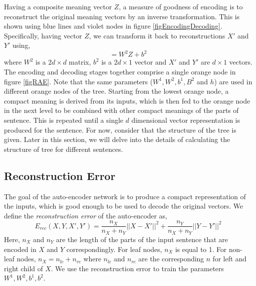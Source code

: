 \documentclass[twoside,12pt]{article}
\begin{document}
Having a composite meaning vector $Z$, a measure of goodness of encoding is to reconstruct the original meaning vectors by an inverse transformation. This is shown using blue lines and violet nodes in figure \ref{figEncodingDecoding}. Specifically, having vector $Z$, we can transform it back to reconstructions $X'$ and $Y'$ using,
\begin{equation}
[X',Y'] = W^2 Z + b^2
\label{eqReconst}
\end{equation}
where $W^2$ is a $2d\times d$ matrix, $b^2$ is a $2d\times 1$ vector and $X'$ and $Y'$ are $d\times 1$ vectors. The encoding and decoding stages together comprise a single orange node in figure \ref{figRAE}. Note that the same parameters ($W^1,W^2,b^1,B^2$ and $h$) are used in different orange nodes of the tree. Starting from the lowest orange node, a compact meaning is derived from its inputs, which is then fed to the orange node in the next level to be combined with other compact meanings of the parts of sentence. This is repeated until a single $d$ dimensional vector representation is produced for the sentence. For now, consider that the structure of the tree is given. Later in this section, we will delve into the details of calculating the structure of tree for different sentences.

\subsection{Reconstruction Error}
The goal of the auto-encoder network is to produce  a compact representation of the inputs, which is good enough to be used to decode the original vectors. We define the \emph{reconstruction error} of the auto-encoder as,
\begin{equation}
E_{rec}(X,Y,X',Y') = \frac{n_X}{n_X+n_Y}||X-X'||^2+\frac{n_Y}{n_X+n_Y}||Y-Y'||^2
\label{eqRecErr}
\end{equation}
Here, $n_X$ and $n_Y$ are the length of the parts of the input sentence that are encoded in $X$ and $Y$ correspondingly. For leaf nodes, $n_X$ is equal to 1. For non-leaf nodes, $n_X = n_{lc} + n_{rc}$ where $n_{lc}$ and $n_{rc}$ are the corresponding $n$ for left and right child of $X$. We use the reconstruction error to train the parameters $W^1,W^2,b^1,b^2$.
\end{document}
